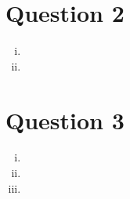 \documentclass{article}
\begin{document}

\section*{Question 2}

\begin{enumerate}[(i)]
	\item 
	

	\item 
	
	
\end{enumerate}



\section*{Question 3}

\begin{enumerate}[(i)]
	\item 
	

	\item 
	

	\item 
	
	
\end{enumerate}




\end{document}
